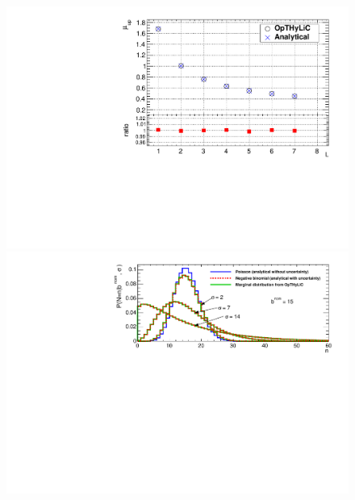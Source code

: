 \begin{frame}
\begin{columns}
\begin{column}{0.5\textwidth}
\begin{figure}[!htb]
\begin{center}
\pause
\vspace*{0.4cm}
\hspace*{0.3cm}
\includegraphics[width=1\textwidth]{Figures/Stat/SingleChannelNoUncertainties.pdf} \\
\pause
\vspace*{-0.8cm}
\hspace*{-0.5cm}
\includegraphics[width=1.2\textwidth]{Figures/Stat/SingleChannelStatUncertNegativeBinomial.pdf}\\
\pause
\vspace*{-0.9cm}
\hspace*{0.5cm}

\end{center}
\end{figure}
\end{column}
\end{columns}
\end{frame}
